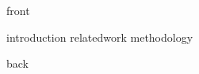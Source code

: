 \documentclass{beamer}
\begin{document}
{front}

{introduction}
{relatedwork}
{methodology}

{back}
											 								
\end{document}
